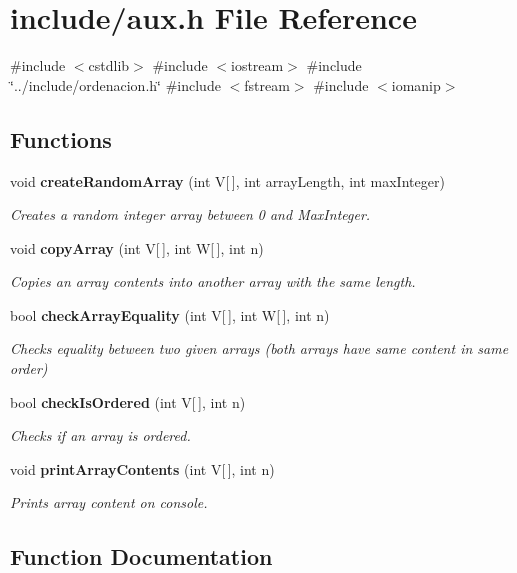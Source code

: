 \section{include/aux.h \-File \-Reference}
\label{aux_8h}
{\ttfamily \#include $<$cstdlib$>$}\*
{\ttfamily \#include $<$iostream$>$}\*
{\ttfamily \#include \char`\"{}../include/ordenacion.\-h\char`\"{}}\*
{\ttfamily \#include $<$fstream$>$}\*
{\ttfamily \#include $<$iomanip$>$}\*
\subsection*{\-Functions}
\begin{DoxyCompactItemize}
\item 
void {\bf create\-Random\-Array} (int \-V[$\,$], int array\-Length, int max\-Integer)
\begin{DoxyCompactList}\small\item\em \-Creates a random integer array between 0 and \-Max\-Integer. \end{DoxyCompactList}\item 
void {\bf copy\-Array} (int \-V[$\,$], int \-W[$\,$], int n)
\begin{DoxyCompactList}\small\item\em \-Copies an array contents into another array with the same length. \end{DoxyCompactList}\item 
bool {\bf check\-Array\-Equality} (int \-V[$\,$], int \-W[$\,$], int n)
\begin{DoxyCompactList}\small\item\em \-Checks equality between two given arrays (both arrays have same content in same order) \end{DoxyCompactList}\item 
bool {\bf check\-Is\-Ordered} (int \-V[$\,$], int n)
\begin{DoxyCompactList}\small\item\em \-Checks if an array is ordered. \end{DoxyCompactList}\item 
void {\bf print\-Array\-Contents} (int \-V[$\,$], int n)
\begin{DoxyCompactList}\small\item\em \-Prints array content on console. \end{DoxyCompactList}\end{DoxyCompactItemize}


\subsection{\-Function \-Documentation}
